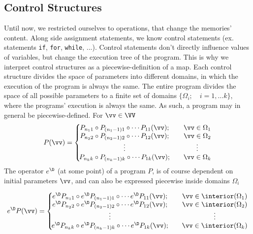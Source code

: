 \subsection{Control Structures}\label{sec:control}
 
 Until now, we restricted ourselves to operations, that change the memories' content. Along side assignment statements, we know control statements (ex. statements \texttt{if},
  \texttt{for}, \texttt{while}, ...). Control statements don't directly
  influence values of variables, but change the execution tree of the program. This is why
  we interpret control structures as a piecewise-definition of a map.
 Each control structure divides the space of parameters into different domains, in which the execution of the program is always the same. The entire program divides the space of all possible parameters to a finite set of domains $\{\Omega_i;\quad i=1,\ldots
  k\}$, where the programs' execution is always the same. As such, a program may in general be piecewise-defined. For $\vv\in\VV$
 \begin{equation}
   \label{eq:zlrprk_splosno}
   P(\vv) =
   \left\{\!\begin{matrix}
     P_{n_11}\circ P_{(n_1-1)1}\circ\cdots P_{11}(\vv);&\quad \vv\in\Omega_1\\
     P_{n_22}\circ P_{(n_2-1)2}\circ\cdots P_{12}(\vv);&\quad \vv\in\Omega_2\\
     \vdots&\quad\vdots\\
     P_{n_kk}\circ P_{(n_k-1)k}\circ\cdots P_{1k}(\vv);&\quad \vv\in\Omega_k\\
   \end{matrix}\right.
 \end{equation}
 The operator $e^\D$ (at some point) of a program $P$, is of course dependent on initial parameters $\vv$, and can also be expressed piecewise inside domains $\Omega_i$




 \begin{equation}
   \label{eq:Dzlrprk_splosno}
   e^\D P({\vv}) =
   \left\{\!\begin{matrix}
     e^\D P_{n_11}\circ e^\D P_{(n_1-1)1}\circ\cdots e^\D P_{11}(\vv);&\quad \vv\in\interior(\Omega_1)\\
     e^\D P_{n_22}\circ e^\D P_{(n_2-1)2}\circ\cdots e^\D P_{12}(\vv);&\quad \vv\in\interior(\Omega_2)\\
     \vdots&\quad\vdots\\
     e^\D P_{n_kk}\circ e^\D P_{(n_k-1)k}\circ\cdots e^\D P_{1k}(\vv);&\quad \vv\in\interior(\Omega_k)\\
   \end{matrix}\right.
 \end{equation}

